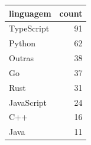 \begin{tabular}{lr}
\toprule
linguagem & count \\
\midrule
TypeScript & 91 \\
Python & 62 \\
Outras & 38 \\
Go & 37 \\
Rust & 31 \\
JavaScript & 24 \\
C++ & 16 \\
Java & 11 \\
\bottomrule
\end{tabular}
